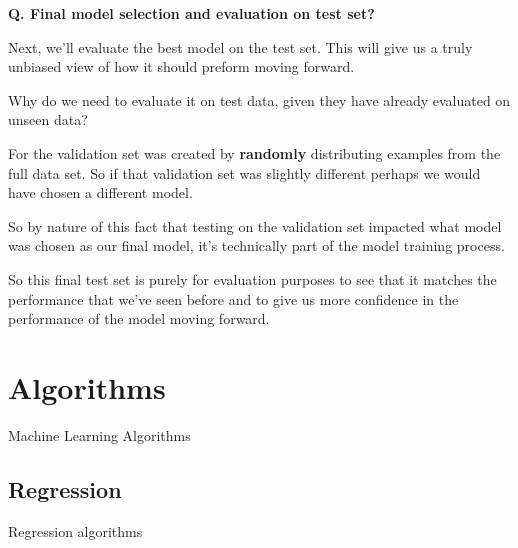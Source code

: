 \begin{frame}[fragile]{\textbf{Q. Final model selection and evaluation on test set?}}
  \begin{wideitemize}\small
    \item Next, we'll evaluate the best model on the test set. This will give us
    a truly unbiased view of how it should preform moving forward.
    \item Why do we need to evaluate it on test data, given they have already evaluated on unseen data?
    \medskip
    \begin{wideitemize}
      \item For the validation set was created by \textbf{randomly} distributing examples from
      the full data set. So if that validation set was slightly different perhaps we would
      have chosen a different model.
      \item So by nature of this fact that testing on the validation set impacted what model
      was chosen as our final model, it's technically part of the model training process.
      \item So this final test set is purely for evaluation purposes to see that it matches
      the performance that we've seen before and to give us more confidence in the performance
      of the model moving forward.
    \end{wideitemize}
  \end{wideitemize}
\end{frame}

\section{Algorithms}
\begin{transitionframe}
  \begin{center}
    \Huge Machine Learning Algorithms
  \end{center}
\end{transitionframe}

\subsection{Regression}
\begin{transitionsubframe}
  \begin{center}
    \Huge Regression algorithms
  \end{center}
\end{transitionsubframe}

